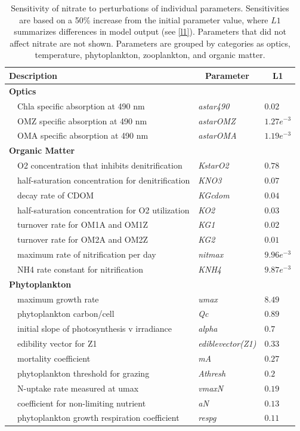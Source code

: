 \documentclass[review]{elsarticle}\usepackage[]{graphicx}\usepackage[]{color}
\begin{document}
\begin{table}[!tbp]
{\footnotesize
\caption{Sensitivity of nitrate to perturbations of individual parameters.  Sensitivities are based on a 50\% increase from the initial parameter value, where $L1$ summarizes differences in model output (see \cref{l1}).  Parameters that did not affect nitrate are not shown.  Parameters are grouped by categories as optics, temperature, phytoplankton, zooplankton, and organic matter.\label{tab:no3sens}} 
\begin{center}
\begin{tabular}{lll}
\hline\hline
\multicolumn{1}{l}{Description}&\multicolumn{1}{c}{Parameter}&\multicolumn{1}{c}{L1}\tabularnewline
\hline
{\bfseries Optics}&&\tabularnewline
~~Chla specific absorption at 490 nm&\textit{astar490}&$0.02$\tabularnewline
~~OMZ specific absorption at 490 nm&\textit{astarOMZ}&$1.27e^{-3}$\tabularnewline
~~OMA specific absorption at 490 nm&\textit{astarOMA}&$1.19e^{-3}$\tabularnewline
\hline
{\bfseries Organic Matter}&&\tabularnewline
~~O2 concentration that inhibits denitrification&\textit{KstarO2}&$0.78$\tabularnewline
~~half-saturation concentration for denitrification&\textit{KNO3}&$0.07$\tabularnewline
~~decay rate of CDOM&\textit{KGcdom}&$0.04$\tabularnewline
~~half-saturation concentration for O2 utilization&\textit{KO2}&$0.03$\tabularnewline
~~turnover rate for OM1A and OM1Z&\textit{KG1}&$0.02$\tabularnewline
~~turnover rate for OM2A and OM2Z&\textit{KG2}&$0.01$\tabularnewline
~~maximum rate of nitrification per day&\textit{nitmax}&$9.96e^{-3}$\tabularnewline
~~NH4 rate constant for nitrification&\textit{KNH4}&$9.87e^{-3}$\tabularnewline
\hline
{\bfseries Phytoplankton}&&\tabularnewline
~~maximum growth rate&\textit{umax}&$8.49$\tabularnewline
~~phytoplankton carbon/cell&\textit{Qc}&$0.89$\tabularnewline
~~initial slope of photosynthesis v irradiance&\textit{alpha}&$0.7$\tabularnewline
~~edibility vector for Z1&\textit{ediblevector(Z1)}&$0.33$\tabularnewline
~~mortality coefficient&\textit{mA}&$0.27$\tabularnewline
~~phytoplankton threshold for grazing&\textit{Athresh}&$0.2$\tabularnewline
~~N-uptake rate measured at umax&\textit{vmaxN}&$0.19$\tabularnewline
~~coefficient for non-limiting nutrient&\textit{aN}&$0.13$\tabularnewline
~~phytoplankton growth respiration coefficient&\textit{respg}&$0.11$\tabularnewline

\end{tabular}
\end{center}}
\end{table}
\end{document}
